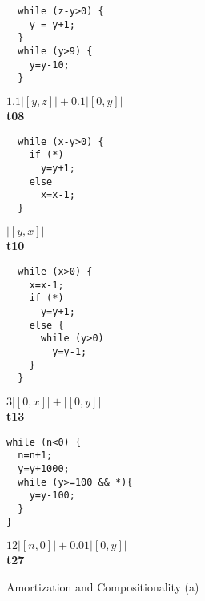\documentclass[nocopyrightspace,preprint]{sigplanconf}
\begin{document}
\begin{figure*}[t!]
\setlength{\progwidth}{.24\linewidth}
  \centering

  \begin{minipage}[b]{\progwidth}
    \begin{center}
   \begin{lstlisting}
  while (z-y>0) {
    y = y+1;
  }
  while (y>9) {
    y=y-10;
  }
   \end{lstlisting}

$1.1|[y,z]| + 0.1|[0,y]|$
\\[.7\baselineskip] 
      {\bf t08}
    \end{center}
  \end{minipage}
%
%
%
  \begin{minipage}[b]{\progwidth}
    \begin{center}
   \begin{lstlisting}
  while (x-y>0) {
    if (*)
      y=y+1;
    else
      x=x-1;
  }
   \end{lstlisting}

$|[y,x]|$
\\[.7\baselineskip]
      {\bf t10}
    \end{center}
  \end{minipage}
%
%
%
  \begin{minipage}[b]{\progwidth}
    \begin{center}
   \begin{lstlisting}
  while (x>0) {
    x=x-1;
    if (*) 
      y=y+1;
    else {
      while (y>0)
        y=y-1;
    }
  }
   \end{lstlisting}

$3|[0,x]| + |[0,y]|$
\\[.7\baselineskip]
      {\bf t13}
    \end{center}
  \end{minipage}
%
%
%
  \begin{minipage}[b]{\progwidth}
    \begin{center}
   \begin{lstlisting}
while (n<0) {
  n=n+1;
  y=y+1000;
  while (y>=100 && *){
    y=y-100;
  }
}
   \end{lstlisting}

$12|[n,0]| + 0.01|[0,y]|$
\\[.7\baselineskip]
      {\bf t27}
    \end{center}
  \end{minipage}
   \caption{Amortization and Compositionality (a)}
  \label{fig:cat1a}
\end{figure*}
\end{document}
